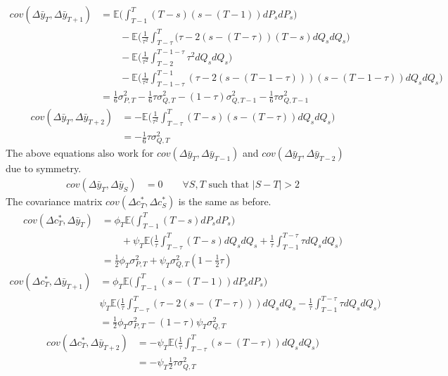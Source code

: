 \begin{align}
cov(\Delta \bar{y}_T, \Delta \bar{y}_{T+1}) &=  \mathbb{E} \Big(\int_{T-1}^{T} (T-s)(s-(T-1)) dP_s dP_s  \Big) \nonumber \\
&  \qquad -\mathbb{E} \Big(\frac{1}{\tau^2}\int_{T-\tau}^{T} (\tau - 2(s-(T-\tau))(T-s)  dQ_s dQ_s  \Big)\nonumber\\
& \qquad -\mathbb{E} \Big(\frac{1}{\tau^2}\int_{T-2}^{T-1-\tau} \tau^2 dQ_s dQ_s \Big)\nonumber \\
& \qquad -\mathbb{E} \Big(\frac{1}{\tau^2} \int_{T-1-\tau}^{T-1} (\tau - 2(s-(T-1-\tau))) (s-(T-1-\tau))dQ_sdQ_s \Big) \nonumber \\
&= \frac{1}{6}\sigma^2_{P,T} -\frac{1}{6}\tau\sigma^2_{Q,T} - (1-\tau)\sigma^2_{Q,T-1} -\frac{1}{6}\tau\sigma^2_{Q,T-1}
\end{align}
\begin{align}
cov(\Delta \bar{y}_T, \Delta \bar{y}_{T+2}) &=  -\mathbb{E} \Big(\frac{1}{\tau^2}\int_{T-\tau}^{T} (T-s)(s-(T-\tau)) dQ_s dQ_s  \Big) \nonumber \\
&= -\frac{1}{6}\tau \sigma^2_{Q,T}
\end{align}
The above equations also work for $cov(\Delta \bar{y}_T, \Delta \bar{y}_{T-1})$ and $cov(\Delta \bar{y}_T, \Delta \bar{y}_{T-2})$ due to symmetry.
\begin{align}
cov(\Delta \bar{y}_T, \Delta \bar{y}_{S}) &= 0 \qquad \forall S,T \text{ such that }|S-T| >2 
\end{align}
The covariance matrix $cov(\Delta c^*_T, \Delta c^*_{S})$ is the same as before.
\begin{align}
cov(\Delta c_T^*, \Delta \bar{y}_T) &= \phi_T \mathbb{E} \Big(  \int_{T-1}^{T} (T-s) dP_s dP_s \Big) \nonumber \\
& \qquad + \psi_T \mathbb{E}\Big(\frac{1}{\tau}\int_{T-\tau}^{T} (T-s)dQ_s dQ_s +\frac{1}{\tau}\int_{T-1}^{T-\tau} \tau dQ_s dQ_s \Big) \nonumber \\
&= \frac{1}{2} \phi_T \sigma^2_{P,T} + \psi_T \sigma^2_{Q,T} (1-\frac{1}{2}\tau )
\end{align}
\begin{align}
cov(\Delta c_T^*, \Delta \bar{y}_{T+1}) &=  \phi_T \mathbb{E} \Big(  \int_{T-1}^{T} (s-(T-1)) dP_s dP_s \Big) \nonumber \\
&  \psi_T \mathbb{E} \Big(  \frac{1}{\tau} \int_{T-\tau}^{T} (\tau - 2(s-(T-\tau)))dQ_s dQ_s -\frac{1}{\tau} \int_{T-1}^{T-\tau} \tau dQ_s dQ_s \Big) \nonumber \\
&= \frac{1}{2} \phi_T \sigma^2_{P,T} - (1-\tau) \psi_T \sigma^2_{Q,T}
\end{align}
\begin{align}
cov(\Delta c_T^*, \Delta \bar{y}_{T+2}) &=  -\psi_T \mathbb{E} \Big(  \frac{1}{\tau} \int_{T-\tau}^{T} (s-(T-\tau)) dQ_s dQ_s\Big) \nonumber \\
&= -\psi_T  \frac{1}{2}\tau \sigma^2_{Q,T}
\end{align}